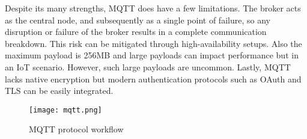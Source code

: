 Despite its many strengths, MQTT does have a few limitations. The broker acts as the central node, and subsequently as a single point of failure, so any disruption or failure of the broker results in a complete communication breakdown. This risk can be mitigated through high-availability setups. Also the maximum payload is 256MB and large payloads can impact performance but in an IoT scenario. However, such large payloads are uncommon. Lastly, MQTT lacks native encryption but modern authentication protocols such as OAuth and TLS can be easily integrated\cite{mqtt}.

\begin{figure}[!h]
    \graphicspath{ {./diagrams/} }
    \texttt{[image: mqtt.png]}
    \centering
    \caption{MQTT protocol workflow}
    \label{fig:mqtt}
\end{figure}